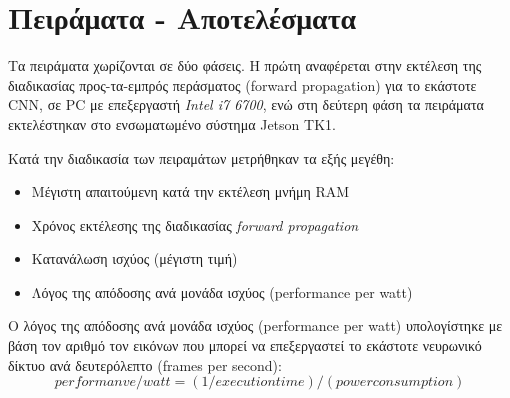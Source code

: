 \chapter{Πειράματα - Αποτελέσματα}
\label{chapter:experiments}

Τα πειράματα χωρίζονται σε δύο φάσεις. Η πρώτη αναφέρεται στην εκτέλεση
της διαδικασίας προς-τα-εμπρός περάσματος (forward propagation) για το εκάστοτε
CNN, σε PC με επεξεργαστή \emph{Intel i7 6700}, ενώ στη δεύτερη φάση τα πειράματα εκτελέστηκαν στο
ενσωματωμένο σύστημα Jetson TK1.

Κατά την διαδικασία των πειραμάτων μετρήθηκαν τα εξής μεγέθη:
\begin{itemize}
  \item{Μέγιστη απαιτούμενη κατά την εκτέλεση μνήμη RAM}
  \item{Χρόνος εκτέλεσης της διαδικασίας \emph{forward propagation}}
  \item{Κατανάλωση ισχύος (μέγιστη τιμή)}
  \item{Λόγος της απόδοσης ανά μονάδα ισχύος (performance per watt)}
\end{itemize}

Ο λόγος της απόδοσης ανά μονάδα ισχύος (performance per watt) υπολογίστηκε
με βάση τον αριθμό τον εικόνων που μπορεί να επεξεργαστεί το εκάστοτε
νευρωνικό δίκτυο ανά δευτερόλεπτο (frames per second):
\begin{equation*}
  performanve / watt = (1 / execution time) / (power consumption)
\end{equation*}



